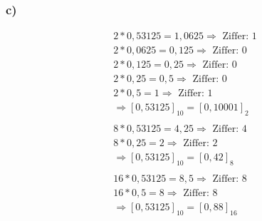 \documentclass[12pt,a4paper]{article}
\begin{document}
\subsubsection*{c)}
\begin{align*}
2 * 0,53125 = 1,0625 \Rightarrow \textrm{ Ziffer: } 1 \\
2 * 0,0625 = 0,125 \Rightarrow \textrm{ Ziffer: } 0 \\
2 * 0,125 = 0,25 \Rightarrow \textrm{ Ziffer: } 0 \\
2 * 0,25 = 0,5 \Rightarrow \textrm{ Ziffer: } 0 \\
2 * 0,5 = 1 \Rightarrow \textrm{ Ziffer: } 1 \\
\Rightarrow [0,53125]_{10} = [0,10001]_{2} \\
\\
8 * 0,53125 = 4,25 \Rightarrow \textrm{ Ziffer: } 4 \\
8 * 0,25 = 2 \Rightarrow \textrm{ Ziffer: } 2 \\
\Rightarrow [0,53125]_{10} = [0,42]_{8} \\
\\
16 * 0,53125 = 8,5 \Rightarrow \textrm{ Ziffer: } 8 \\
16 * 0,5 = 8 \Rightarrow \textrm{ Ziffer: } 8 \\
\Rightarrow [0,53125]_{10} = [0,88]_{16}
\end{align*}
\end{document}
